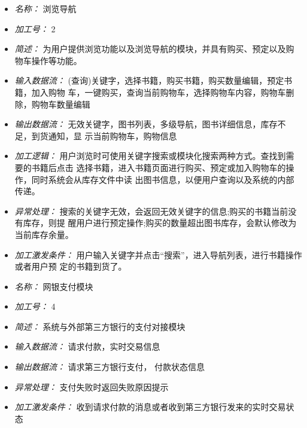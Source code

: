 \vspace{-1mm}


\begin{itemize}
\item \textit{名称： }浏览导航
\item \textit{加工号： }2 
\item \textit{简述： }为用户提供浏览功能以及浏览导航的模块，并具有购买、预定以及购物车操作等功能。 
\item \textit{输入数据流： }(查询)关键字，选择书籍，购买书籍，购买数量编辑，预定书籍，加入购物 车，一键购买，查询当前购物车，选择购物车内容，购物车删除，购物车数量编辑 
\item \textit{输出数据流： }无效关键字，图书列表，多级导航，图书详细信息，库存不足，到货通知，显 示当前购物车，购物信息
\item \textit{加工逻辑： }用户浏览时可使用关键字搜索或模块化搜索两种方式。查找到需要的书籍后点击 选择书籍，进入书籍页面进行购买、预定或加入购物车的操作，同时系统会从库存文件中读 出图书信息，以便用户查询以及系统的内部传递。 
\item \textit{异常处理： }搜索的关键字无效，会返回无效关键字的信息;购买的书籍当前没有库存，则提 醒用户进行预定操作;购买的数量超出图书库存，会默认修改为当前库存余量。 
\item \textit{加工激发条件： }用户输入关键字并点击“搜索”，进入导航列表，进行书籍操作或者用户预 定的书籍到货了。

\end{itemize}


\vspace{-1mm}


\begin{itemize}
\item \textit{名称： } 网银支付模块
\item \textit{加工号： }4
\item \textit{简述： } 系统与外部第三方银行的支付对接模块
\item \textit{输入数据流： } 请求付款，实时交易信息
\item \textit{输出数据流： } 请求第三方银行支付， 付款状态信息
\item \textit{异常处理： } 支付失败时返回失败原因提示
\item \textit{加工激发条件： } 收到请求付款的消息或者收到第三方银行发来的实时交易状态

\end{itemize}


\vspace{-1mm}



